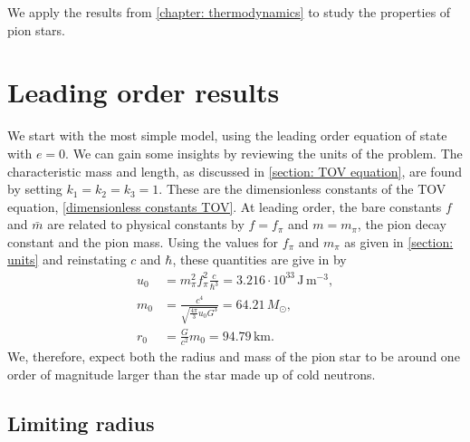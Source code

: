 
We apply the results from \autoref{chapter: thermodynamics} to study the properties of pion stars.

\section{Leading order results}

We start with the most simple model, using the leading order equation of state with $e = 0$.
We can gain some insights by reviewing the units of the problem.
The characteristic mass and length, as discussed in \autoref{section: TOV equation}, are found by setting $k_1 = k_2 = k_3 = 1$.
These are the dimensionless constants of the TOV equation, \autoref{dimensionless constants TOV}.
At leading order, the bare constants $f$ and $\bar m$ are related to physical constants by $f = f_\pi$ and $m = m_\pi$, the pion decay constant and the pion mass.
Using the values for $f_\pi$ and $m_\pi$ as given in \autoref{section: units} and reinstating $c$ and $\hbar$, these quantities are give in by
%
\begin{align}
    u_0 & =m_\pi^2 f_\pi^2 \frac{c}{\hbar^3}
    = 3.216\cdot 10^{33} \, \text{J}\,\text{m}^{-3}, \\
    m_0 & = \frac{c^4}{\sqrt{\frac{4 \pi}{ 3} u_0 G^3}} = 64.21\, M_\odot, \\
    r_0 & = \frac{G}{c^2} m_0 = 94.79 \, \text{km}.
\end{align}
%
We, therefore, expect both the radius and mass of the pion star to be around one order of magnitude larger than the star made up of cold neutrons.

\subsection{Limiting radius}

